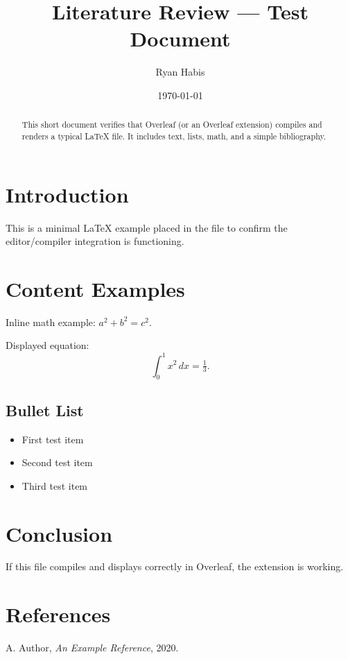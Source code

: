 \documentclass[11pt]{article}
\title{Literature Review — Test Document}
\author{Ryan Habis}
\date{\today}
\begin{document}
\maketitle

\begin{abstract}
This short document verifies that Overleaf (or an Overleaf extension) compiles and renders a typical LaTeX file. It includes text, lists, math, and a simple bibliography.
\end{abstract}

\section{Introduction}
This is a minimal LaTeX example placed in the file to confirm the editor/compiler integration is functioning.

\section{Content Examples}
Inline math example: $a^2 + b^2 = c^2$.  

Displayed equation:
\[
\int_0^1 x^2 \, dx = \tfrac{1}{3}.
\]

\subsection{Bullet List}
\begin{itemize}
    \item First test item
    \item Second test item
    \item Third test item
\end{itemize}

\section{Conclusion}
If this file compiles and displays correctly in Overleaf, the extension is working.

\section*{References}
\begin{thebibliography}{9}
A. Author, \textit{An Example Reference}, 2020.
\end{thebibliography}
\end{document}
